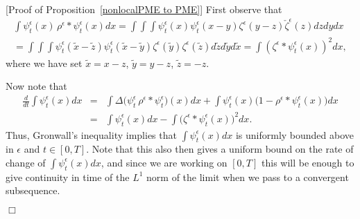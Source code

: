 \documentclass[12pt]{article}
\newenvironment {proof}{{\noindent\bf Proof }}{\hfill $\Box$ \medskip}
\def \tilde{\widetilde}
\numberwithin{equation}{section}
\begin{document}
\begin{proof}[Proof of Proposition~\ref{nonlocalPME to PME}]
First observe that
\begin{multline*}
	\int \psi_t^\epsilon(x)\, \rho^{\epsilon}*\psi_t^\epsilon(x) dx 
=
\int\int\int \psi_t^\epsilon(x)\psi_t^\epsilon(x-y)\zeta^{\epsilon}(y-z)
\check{\zeta}^{\epsilon}(z) dz dy dx 
\\
=
\int\int\int \psi_t^\epsilon(\tilde{x}-\tilde{z})
\psi_t^\epsilon(\tilde{x}-\tilde{y})
\zeta^{\epsilon}(\tilde{y})
\zeta^{\epsilon}(\tilde{z}) d\tilde{z} d\tilde{y} d \tilde{x}
	=\int\left(\zeta^{\epsilon}*\psi_t^\epsilon(x)\right)^2 dx,
\end{multline*}
where we have set $\tilde{x}=x-z$, $\tilde{y}=y-z$, $\tilde{z}=-z$.

Now note that
\begin{eqnarray*}
\frac{d}{dt}\int \psi_t^\epsilon (x) dx
	&=&
\int \Delta \big(\psi_t^\epsilon \, \rho^{\epsilon}*\psi_t^\epsilon\big)(x) dx 
	+\int \psi_t^\epsilon(x)\big(1-\rho^{\epsilon}*\psi_t^\epsilon(x)\big) dx
\\	
&=&
 \int \psi_t^\epsilon (x) d x
	-\int \big(\zeta^{\epsilon}*\psi_t^\epsilon(x)\big)^2  dx.
\end{eqnarray*}
Thus, Gronwall's inequality implies that $\int \psi_t^\epsilon(x) dx$ is uniformly bounded above in
$\epsilon$ and $t\in [0,T]$. Note that this also then gives a uniform
bound on the rate of change of $\int \psi_t^\epsilon (x) d x$, and since
we are working on $[0,T]$ this will be enough to give continuity in time of the
$L^1$ norm of the limit
when we pass to a convergent subsequence.


\end{proof}
\end{document}
